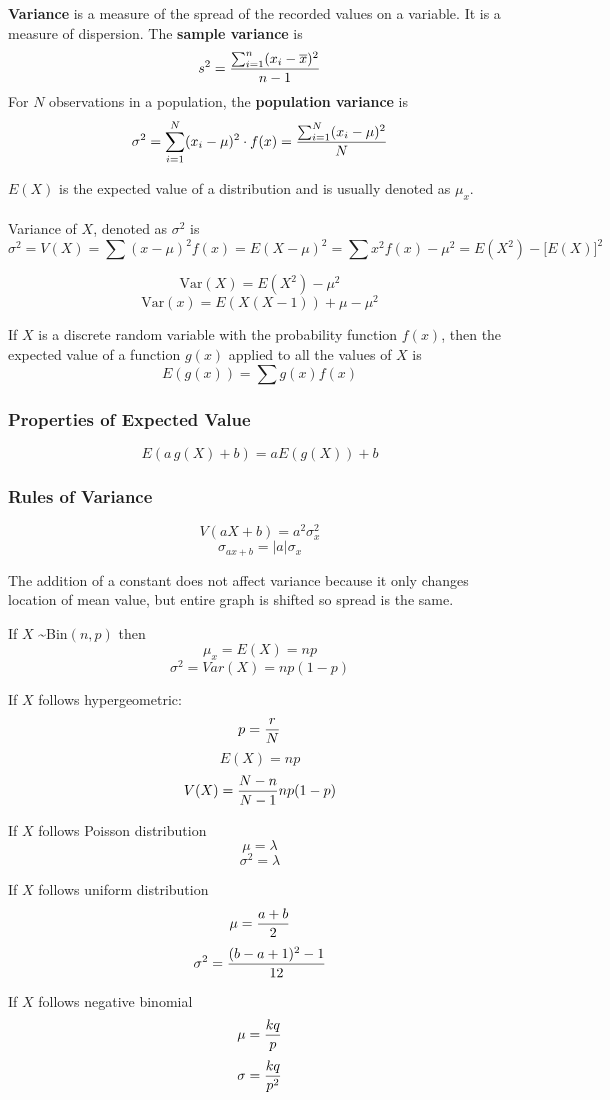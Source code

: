 \documentclass[english, 12pt]{article}
\begin{document}
\begin{defn}
\textbf{Variance} is a measure of the spread of the recorded values on a variable. It is a measure of dispersion. The \textbf{sample variance} is
\[ s^2 = \frac{\sum_{i=1}^n (x_{i}- \overline{x})^2}{n-1}\]
For $N$ observations in a population, the \textbf{population variance} is
\[\sigma^2 = \sum_{i=1}^N (x_{i} - \mu)^2 \cdot f(x) = \frac{\sum_{i=1}^N (x_{i} - \mu)^2}{N}\]
\end{defn}

\begin{defn}
$E(X)$ is the expected value of a distribution and is usually denoted as $\mu_{x}$.\\\\
Variance of $X$, denoted as $\sigma^2$ is
\[\sigma^2 = V(X) = \sum (x-\mu)^2 f(x) = E(X- \mu)^2 = \sum x^2 f(x) - \mu^2 = E(X^2) - \lbrack E(X) \rbrack ^2\]
\end{defn}
\[\text{Var} (X) = E(X^2) - \mu ^2\]
\[\text{Var}(x) = E(X(X-1)) + \mu - \mu^2\]

If $X$ is a discrete random variable with the probability function $f(x)$, then the expected value of a function $g(x)$ applied to all the values of $X$ is
\[E(g(x)) = \sum g(x) f(x)\]
\subsubsection*{Properties of Expected Value}
\[E(a\,g(X) + b) = a E(g(X)) + b\]
\subsubsection*{Rules of Variance}
\[V(aX + b) = a^2 \sigma^2_{x}\]
\[\sigma_{ax+b} = |a| \sigma_{x}\]
\begin{note}
The addition of a constant does not affect variance because it only changes location of mean value, but entire graph is shifted so spread is the same.
\end{note}

If $X$ \textasciitilde Bin$(n,p)$ then
\[\mu_{x} = E(X) = np\]
\[\sigma^2 = Var(X) = np(1-p)\]

If $X$ follows hypergeometric:
\[p = \frac{r}{N}\]
\[E(X) = np\]
\[V(X) = \frac{N-n}{N-1} np(1-p)\]

If $X$ follows Poisson distribution
\[\mu = \lambda\]
\[\sigma^2 = \lambda\]


If $X$ follows uniform distribution
\[\mu = \frac{a+b}{2}\]
\[\sigma^2 = \frac{(b-a+1)^2 - 1}{12}\]

If $X$ follows negative binomial
\[\mu = \frac{kq}{p}\]
\[\sigma = \frac{kq}{p^2}\]
\end{document}
